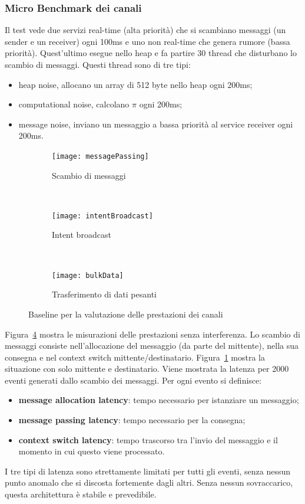 \subsubsection{Micro Benchmark dei canali}
Il test vede due servizi real-time (alta priorità) che si scambiano messaggi (un sender e un receiver) ogni 100ms e uno non real-time che genera rumore (bassa priorità). Quest'ultimo esegue nello heap e fa partire 30 thread che disturbano lo scambio di messaggi. Questi thread sono di tre tipi:
\begin{itemize}
	\item heap noise, allocano un array di 512 byte nello heap ogni 200ms;
	\item computational noise, calcolano $\pi$ ogni 200ms;
	\item message noise, inviano un messaggio a bassa priorità al service receiver ogni 200ms.
\end{itemize}

\begin{figure}
	\centering
	\begin{subfigure}[b]{0.3\textwidth}
		\texttt{[image: messagePassing]}
		\caption{Scambio di messaggi}
		\label{fig:messagePassing}
	\end{subfigure}
	~ 
	\begin{subfigure}[b]{0.3\textwidth}
		\texttt{[image: intentBroadcast]}
		\caption{Intent broadcast}
		\label{fig:intentBroadcast}
	\end{subfigure}
	~
	\begin{subfigure}[b]{0.3\textwidth}
		\texttt{[image: bulkData]}
		\caption{Trasferimento di dati pesanti}
		\label{fig:bulkData}
	\end{subfigure}
	\caption{Baseline per la valutazione delle prestazioni dei canali}\label{fig:baselines}
\end{figure}

Figura~\ref{fig:baselines} mostra le misurazioni delle prestazioni senza interferenza. Lo scambio di messaggi consiste nell'allocazione del messaggio (da parte del mittente), nella sua consegna e nel context switch mittente/destinatario. Figura~\ref{fig:messagePassing} mostra la situazione con solo mittente e destinatario. Viene mostrata la latenza per 2000 eventi generati dallo scambio dei messaggi. Per ogni evento si definisce:
\begin{itemize}
	\item \textbf{message allocation latency}: tempo necessario per istanziare un messaggio;
	\item \textbf{message passing latency}: tempo necessario per la consegna;
	\item \textbf{context switch latency}: tempo trascorso tra l'invio del messaggio e il momento in cui questo viene processato.
\end{itemize}
I tre tipi di latenza sono strettamente limitati per tutti gli eventi, senza nessun punto anomalo che si discosta fortemente dagli altri. Senza nessun sovraccarico, questa architettura è stabile e prevedibile.

